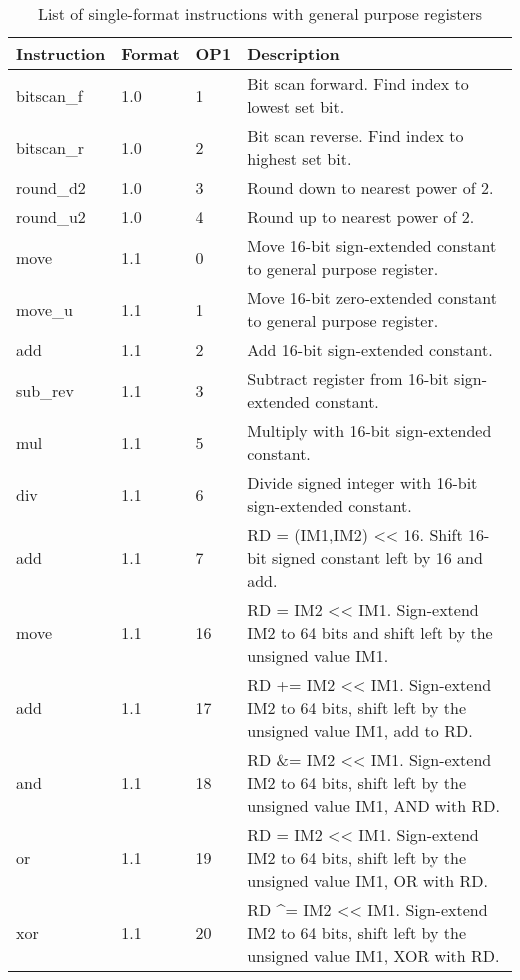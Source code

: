 \documentclass[forwardcom.tex]{subfiles}
\begin{document}
\begin{longtable} {|p{20mm}|p{10mm}|p{8mm}|p{75mm}|}
\caption{List of single-format instructions with general purpose registers} 
\label{table:ListOfSingleFormatInstructionsGP} \\
\endfirsthead
\endhead
\hline
\bfseries Instruction & \bfseries Format &\bfseries OP1 & \bfseries Description \\
\hline
bitscan\_f    & 1.0   &  1 & Bit scan forward. Find index to lowest set bit. \\
bitscan\_r    & 1.0   &  2 & Bit scan reverse. Find index to highest set bit. \\
round\_d2     & 1.0   &  3 & Round down to nearest power of 2. \\
round\_u2     & 1.0   &  4 & Round up to nearest power of 2. \\
move          & 1.1   &  0 & Move 16-bit sign-extended constant to general purpose register. \\
move\_u       & 1.1   &  1 & Move 16-bit zero-extended constant to general purpose register. \\
add           & 1.1   &  2  & Add 16-bit sign-extended constant. \\
sub\_rev      & 1.1   &  3  & Subtract register from 16-bit sign-extended constant. \\
mul           & 1.1   &  5  & Multiply with 16-bit sign-extended constant. \\
div           & 1.1   &  6  & Divide signed integer with 16-bit sign-extended constant. \\
add           & 1.1   &  7  & RD = (IM1,IM2) \textless\textless{} 16. Shift 16-bit signed constant left by 16 and add. \\
move          & 1.1   & 16  & RD = IM2 \textless\textless{} IM1. Sign-extend IM2 to 64 bits and shift left by the unsigned value IM1. \\
add           & 1.1   & 17  & RD += IM2 \textless\textless{} IM1. Sign-extend IM2 to 64 bits, shift left by the unsigned value IM1, add to RD. \\
and           & 1.1   & 18  & RD \&= IM2 \textless\textless{} IM1. Sign-extend IM2 to 64 bits, shift left by the unsigned value IM1, AND with RD. \\
or            & 1.1   & 19  & RD \textbar{}= IM2 \textless\textless{} IM1. Sign-extend IM2 to 64 bits, shift left by the unsigned value IM1, OR with RD. \\
xor           & 1.1   & 20  & RD \^{}= IM2 \textless\textless{} IM1. Sign-extend IM2 to 64 bits, shift left by the unsigned value IM1, XOR with RD. \\

\end{longtable}
\end{document}
